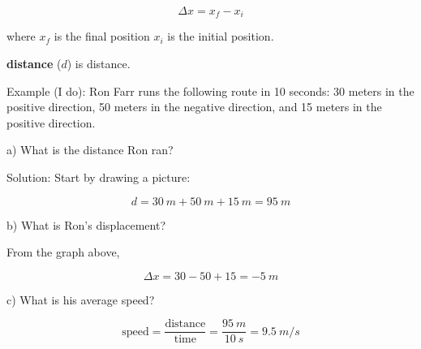\documentclass[dvipsnames]{article}
\begin{document}
\begin{equation}
    \Delta x = x_f - x_i
\end{equation}

where $x_f$ is the final position $x_i$ is the initial position.


\textbf{\Gls{distance}} ($d$) is \glsdesc{distance}.

Example (I do): Ron Farr runs the following route in 10 seconds: 30 meters in the positive direction, 50 meters in the negative direction, and 15 meters in the positive direction. 

a) What is the distance Ron ran?

Solution: Start by drawing a picture:

\begin{center}
\end{center}

\begin{equation*}
    d = \SI{30}{m} + \SI{50}{m} + \SI{15}{m} = \boxed{\SI{95}{m}}
\end{equation*}

b) What is Ron's displacement?

From the graph above,

\begin{equation*}
    \Delta x = 30 - 50 + 15 = \boxed{\SI{-5}{m}}
\end{equation*}

c) What is his average speed?

\begin{equation*}
    \text{speed} = \frac{\text{distance}}{\text{time}} = \frac{\SI{95}{m}}{\SI{10}{s}} = \boxed{\SI{9.5}{m/s}}
\end{equation*}
\end{document}
